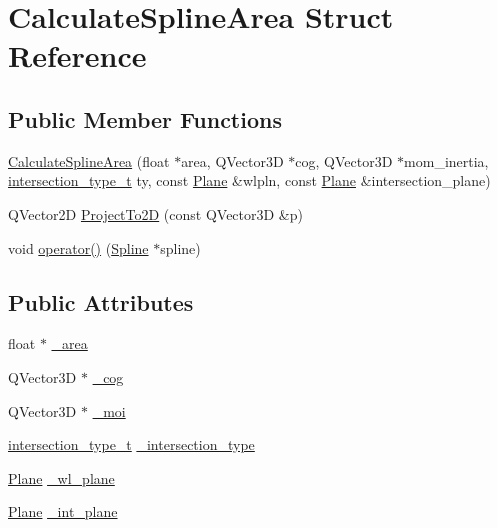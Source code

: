 \hypertarget{structCalculateSplineArea}{}\section{Calculate\+Spline\+Area Struct Reference}
\label{structCalculateSplineArea}
\subsection*{Public Member Functions}
\begin{DoxyCompactItemize}
\item 
\hyperlink{structCalculateSplineArea_a9a8b34be2a02d20258755dd9b125c9b6}{Calculate\+Spline\+Area} (float $\ast$area, Q\+Vector3D $\ast$cog, Q\+Vector3D $\ast$mom\+\_\+inertia, \hyperlink{namespaceShipCAD_aa56834b730aafdf2786ddc9a60a046fd}{intersection\+\_\+type\+\_\+t} ty, const \hyperlink{classShipCAD_1_1Plane}{Plane} \&wlpln, const \hyperlink{classShipCAD_1_1Plane}{Plane} \&intersection\+\_\+plane)
\item 
Q\+Vector2D \hyperlink{structCalculateSplineArea_a03a0bdc26538e48bf5ca311a3b4ba23a}{Project\+To2D} (const Q\+Vector3D \&p)
\item 
void \hyperlink{structCalculateSplineArea_a55da994c2b32cad71e5c8c8f21b09ce0}{operator()} (\hyperlink{classShipCAD_1_1Spline}{Spline} $\ast$spline)
\end{DoxyCompactItemize}
\subsection*{Public Attributes}
\begin{DoxyCompactItemize}
\item 
float $\ast$ \hyperlink{structCalculateSplineArea_a2b059a1a694d22a63c94bde86a8ecd6b}{\+\_\+area}
\item 
Q\+Vector3D $\ast$ \hyperlink{structCalculateSplineArea_abe01c8bb84cfb1900fa06e9e16fcc575}{\+\_\+cog}
\item 
Q\+Vector3D $\ast$ \hyperlink{structCalculateSplineArea_afcd9ae27bc3f89b4fa995f7f1cfd2746}{\+\_\+moi}
\item 
\hyperlink{namespaceShipCAD_aa56834b730aafdf2786ddc9a60a046fd}{intersection\+\_\+type\+\_\+t} \hyperlink{structCalculateSplineArea_aae716b66f114f0217e68efc79ca9cc91}{\+\_\+intersection\+\_\+type}
\item 
\hyperlink{classShipCAD_1_1Plane}{Plane} \hyperlink{structCalculateSplineArea_a0f3126c4f34b545eea5bbce5f340f21c}{\+\_\+wl\+\_\+plane}
\item 
\hyperlink{classShipCAD_1_1Plane}{Plane} \hyperlink{structCalculateSplineArea_a4d0feb7db0aca705a54f2f612290e970}{\+\_\+int\+\_\+plane}
\end{DoxyCompactItemize}


